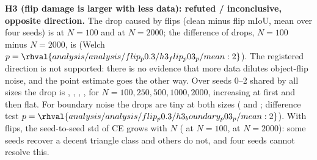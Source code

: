 \textbf{H3 (flip damage is larger with less data): refuted / inconclusive, opposite direction.} The drop caused by flips (clean minus flip mIoU, mean over four seeds) is  at $N=100$ and  at $N=2000$; the difference of drops, $N=100$ minus $N=2000$, is  (Welch $p=\rhval{analysis/analysis/flip_p0.3/h3_flip_p03_p/mean:2}$). The registered direction is not supported: there is no evidence that more data dilutes object-flip noise, and the point estimate goes the other way. Over seeds 0--2 shared by all sizes the drop is , , , ,  for $N=100,250,500,1000,2000$, increasing at first and then flat. For boundary noise the drops are tiny at both sizes ( and ; difference test $p=\rhval{analysis/analysis/flip_p0.3/h3_boundary_p03_p/mean:2}$). With flips, the seed-to-seed std of CE grows with $N$ ( at $N=100$,  at $N=2000$): some seeds recover a decent triangle class and others do not, and four seeds cannot resolve this.

